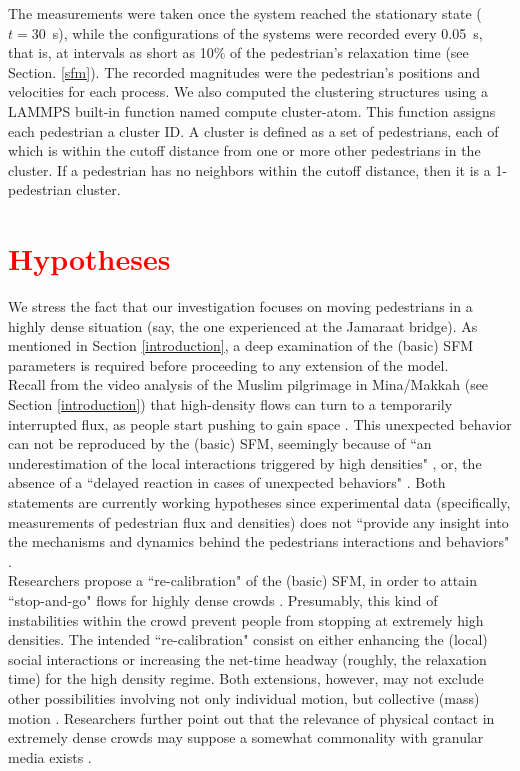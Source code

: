 \documentclass[preprint,12pt]{elsarticle}
\begin{document}
The measurements were taken once the system reached the 
stationary state ($t=30$~s), while the configurations of the systems were 
recorded every 0.05~s, that is, at intervals as short as 10\% of the 
pedestrian’s relaxation time (see Section. \ref{sfm}). The recorded magnitudes 
were the pedestrian’s positions and velocities for each process. We also 
computed the clustering structures using a LAMMPS built-in function 
named compute cluster-atom. This function assigns each pedestrian a cluster ID.
A cluster is defined as a set of pedestrians, each of which is within the cutoff
distance from one or more other pedestrians in the cluster. 
If a pedestrian has no neighbors within the cutoff distance, then it is a 1-pedestrian cluster.\\




\section{\label{Hypotheses} \textcolor{red}{Hypotheses}}

We stress the fact that our investigation focuses on moving
pedestrians in a highly dense situation (say, the one experienced at
the Jamaraat bridge). As mentioned in Section \ref{introduction}, a deep
examination of the (basic) SFM parameters is required before
proceeding to any extension of the model.\\

Recall from the video analysis of the Muslim pilgrimage in Mina/Makkah
(see Section \ref{introduction}) that high-density flows can turn to a
temporarily interrupted flux, as people
start pushing to gain space \cite{helbing3}. This unexpected behavior can not be
reproduced by the (basic) SFM, seemingly because of ``an
underestimation of the local interactions triggered by high densities"
\cite{yu1}, or, the absence of a ``delayed reaction in cases of unexpected
behaviors" \cite{johansson}. Both statements are currently working hypotheses since
experimental data (specifically, measurements of pedestrian flux and
densities) does not ``provide any insight into the mechanisms and
dynamics behind the pedestrians interactions and behaviors" \cite{johansson}.\\

Researchers propose a ``re-calibration" of the (basic) SFM, in order to
attain ``stop-and-go" flows for highly dense crowds
\cite{johansson,yu1}. Presumably, this kind of instabilities within the crowd prevent
people from stopping at extremely high densities. The intended
``re-calibration" consist on either enhancing the (local) social
interactions or increasing the net-time headway (roughly, the
relaxation time) for the high density regime. Both extensions,
however, may not exclude other possibilities involving not only
individual motion, but collective (mass) motion \cite{helbing3}. Researchers
further point out that the relevance of physical contact in extremely
dense crowds may suppose a somewhat commonality with granular
media exists \cite{helbing3}.\\
\end{document}
